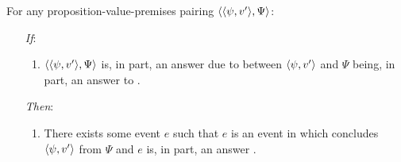 \begin{note}
  \begin{link}
    \label{link:how-witnessing}
    For any proposition-value-premises pairing \(\langle \langle \psi, v' \rangle, \Psi \rangle\):
    \begin{itemize}
    \item[\emph{If}:]
      \begin{enumerate}[label=\alph*., ref=(\alph*)]
      \item
        \(\langle \langle \psi, v' \rangle, \Psi \rangle\) is, in part, an answer \qHow{} due to \ros{} between \(\langle \psi, v' \rangle\) and \(\Psi\) being, in part, an answer to \qWhyV{}.
      \end{enumerate}
    \item[\emph{Then}:]
      \begin{enumerate}[label=\alph*., ref=(\alph*), resume]
      \item
        There exists some event \(e\) such that \(e\) is an event in which \vAgent{} concludes \(\langle \psi, v' \rangle\) from \(\Psi\) and \(e\) is, in part, an answer \qHowV{}.
      \end{enumerate}
    \end{itemize}
    \vspace{-\baselineskip}
  \end{link}

\end{note}


